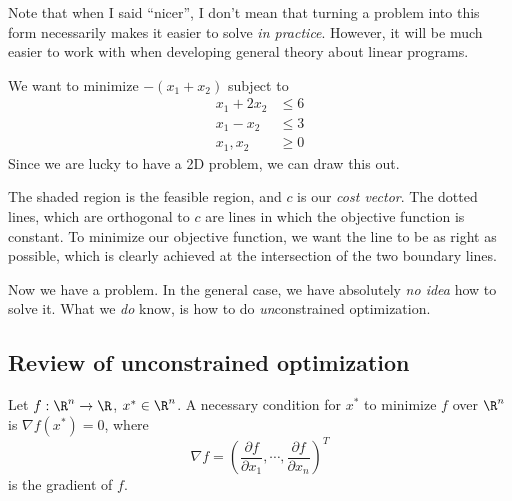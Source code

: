\documentclass[a4paper]{article}
\begin{document}
Note that when I said ``nicer'', I don't mean that turning a problem into this form necessarily makes it easier to solve \emph{in practice}. However, it will be much easier to work with when developing general theory about linear programs.

\begin{eg}
  We want to minimize $-(x_1 + x_2)$ subject to
  \begin{align*}
    x_1 + 2x_2 &\leq 6\\
    x_1 - x_2 &\leq 3\\
    x_1, x_2 &\geq 0
  \end{align*}
  Since we are lucky to have a 2D problem, we can draw this out.
  \begin{center}
  \end{center}
  The shaded region is the feasible region, and $c$ is our \emph{cost vector}. The dotted lines, which are orthogonal to $c$ are lines in which the objective function is constant. To minimize our objective function, we want the line to be as right as possible, which is clearly achieved at the intersection of the two boundary lines.
\end{eg}
Now we have a problem. In the general case, we have absolutely \emph{no idea} how to solve it. What we \emph{do} know, is how to do \emph{un}constrained optimization.

\subsection{Review of unconstrained optimization}
Let $f: \R^n \to \R$, $x^*\in \R^n$. A necessary condition for $x^*$ to minimize $f$ over $\R^n$ is $\nabla f(x^*) = 0$, where
\[
  \nabla  f = \left(\frac{\partial f}{\partial x_1}, \cdots, \frac{\partial f}{\partial x_n}\right)^T
\]
is the gradient of $f$.
\end{document}
